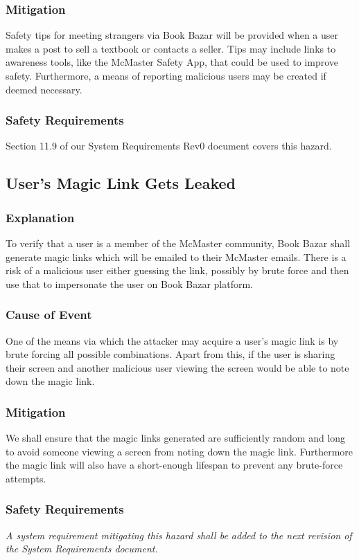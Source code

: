 \documentclass[fullpage]{article}
\begin{document}
\subsubsection*{Mitigation}
Safety tips for meeting strangers via Book Bazar will be provided when a user makes a post to sell a textbook or contacts a seller. Tips may include links to awareness tools, like the McMaster Safety App, that could be used to improve safety. Furthermore, a means of reporting malicious users may be created if deemed necessary.

\subsubsection*{Safety Requirements}
Section 11.9 of our System Requirements Rev0 document covers this hazard.

\subsection{User's Magic Link Gets Leaked}


\subsubsection*{Explanation}
To verify that a user is a member of the McMaster community, Book Bazar shall generate magic links which will be emailed to their McMaster emails. There is a risk of a malicious user either guessing the link, possibly by brute force and then use that to impersonate the user on Book Bazar platform. 
\subsubsection*{Cause of Event}
One of the means via which the attacker may acquire a user's magic link is by brute forcing all possible combinations. Apart from this, if the user is sharing their screen and another malicious user viewing the screen would be able to note down the magic link.

\subsubsection*{Mitigation}
We shall ensure that the magic links generated are sufficiently random and long to avoid someone viewing a screen from noting down the magic link. Furthermore the magic link will also have a short-enough lifespan to prevent any brute-force attempts.
\subsubsection*{Safety Requirements}
\emph{A system requirement mitigating this hazard shall be added to the next revision of the System Requirements document.}
\end{document}
